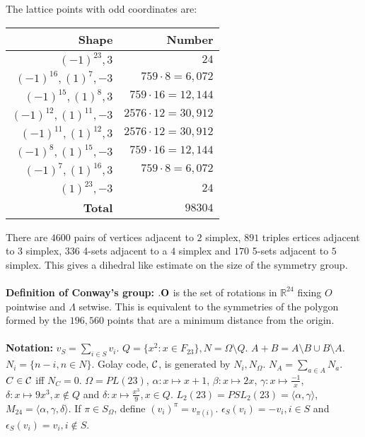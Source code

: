 The lattice points with odd coordinates are:
\begin{center}
\begin{tabular} {|r|r|}
\hline
{\bf Shape} & {\bf Number} \\
\hline
$(-1)^{23}, 3$ & $24$ \\
$(-1)^{16}, (1)^{7}, -3$ & $759 \cdot 8= 6,072$ \\
$(-1)^{15}, (1)^{8}, 3$ & $759 \cdot 16= 12,144$ \\
$(-1)^{12}, (1)^{11}, -3$ & $2576 \cdot 12= 30,912$ \\
$(-1)^{11}, (1)^{12}, 3$ & $2576 \cdot 12= 30,912$ \\
$(-1)^{8}, (1)^{15}, -3$ & $759 \cdot 16= 12,144$ \\
$(-1)^{7}, (1)^{16}, 3$ & $759 \cdot 8= 6,072$ \\
$(1)^{23}, -3$ & $24$ \\
\hline
{\bf Total} & $98304$\\
\hline
\end{tabular}
\end{center}
There are 
$4600$ pairs of vertices adjacent to $2$ simplex,
$891$ triples ertices adjacent to $3$ simplex,
$336$ 4-sets adjacent to a $4$ simplex and
$170$ 5-sets adjacent to $5$ simplex.  
This gives a dihedral like estimate on the size of the symmetry group.
\\
\\
{\bf Definition of
Conway's group:} ${\bf .O}$ is the set of rotations in ${\mathbb R}^{24}$ fixing $O$ 
pointwise and $\Lambda$ setwise.  This is equivalent to the symmetries of the polygon formed
by the $196,560$ points that are a minimum distance from the origin.
\\
\\
{\bf Notation:}
$v_S= \sum_{i \in S} v_i$. 
$Q= \{ x^2: x \in F_{23} \}, N= \Omega \setminus Q$.
$A+B= A \setminus B \cup B \setminus A$.  $N_i= \{ n-i, n \in N \}$.  Golay code,
${\cal C}$, is
generated by $N_i, N_{\Omega}$.  $N_A = \sum_{a \in A} N_a$.  $C \in {\cal C}$ iff $N_C=0$.
$\Omega= PL(23)$, $\alpha: x \mapsto x+1$, $\beta: x \mapsto 2x$,
$\gamma: x \mapsto {\frac {-1} x}$, 
$\delta: x \mapsto 9 x^3, x \notin Q$ and
$\delta: x \mapsto {\frac {x^3} 9}, x \in Q$.  
$L_2(23)= PSL_2(23)= \langle \alpha, \gamma \rangle$,
$M_{24}= \langle \alpha, \gamma, \delta \rangle$.  If $\pi \in S_{\Omega}$, define
$(v_i)^{\pi} = v_{\pi(i)}$.  
$\epsilon_S(v_i) = -v_i, i \in S$ and
$\epsilon_S(v_i) = v_i, i \notin S$.
\\
\\
